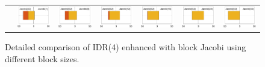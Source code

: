 \begin{landscape}
\begin{figure}
\begin{center}
{\begin{tabular}{c|cccccc}
\\
&
\includegraphics[width=.135\columnwidth]{plots/Jacobi(32)_vs_Jacobi(1).pdf}
&
\includegraphics[width=.135\columnwidth]{plots/Jacobi(32)_vs_Jacobi(8).pdf}
&
\includegraphics[width=.135\columnwidth]{plots/Jacobi(32)_vs_Jacobi(12).pdf}
&
\includegraphics[width=.135\columnwidth]{plots/Jacobi(32)_vs_Jacobi(16).pdf}
&
\includegraphics[width=.135\columnwidth]{plots/Jacobi(32)_vs_Jacobi(24).pdf}
&
 \includegraphics[width=.135\columnwidth]{plots/Jacobi(32)_vs_Jacobi(32).pdf}
\\
\end{tabular}
}
\end{center}
\caption{
Detailed comparison of IDR(4) enhanced with block Jacobi
using different block sizes.
}
\label{2017-gje-block-jacobi:fig:solverperformance-detailed}
\end{figure}

\end{landscape}
